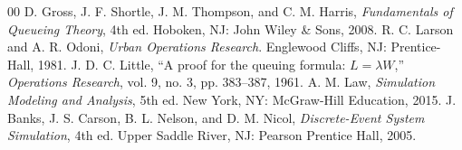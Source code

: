 \documentclass[conference]{IEEEtran}
\begin{document}
\begin{thebibliography}{00}
 D. Gross, J. F. Shortle, J. M. Thompson, and C. M. Harris, \textit{Fundamentals of Queueing Theory}, 4th ed. Hoboken, NJ: John Wiley \& Sons, 2008.
 R. C. Larson and A. R. Odoni, \textit{Urban Operations Research}. Englewood Cliffs, NJ: Prentice-Hall, 1981.
 J. D. C. Little, ``A proof for the queuing formula: $L = \lambda W$,'' \textit{Operations Research}, vol. 9, no. 3, pp. 383--387, 1961.
 A. M. Law, \textit{Simulation Modeling and Analysis}, 5th ed. New York, NY: McGraw-Hill Education, 2015.
 J. Banks, J. S. Carson, B. L. Nelson, and D. M. Nicol, \textit{Discrete-Event System Simulation}, 4th ed. Upper Saddle River, NJ: Pearson Prentice Hall, 2005.
\end{thebibliography}
\end{document}
